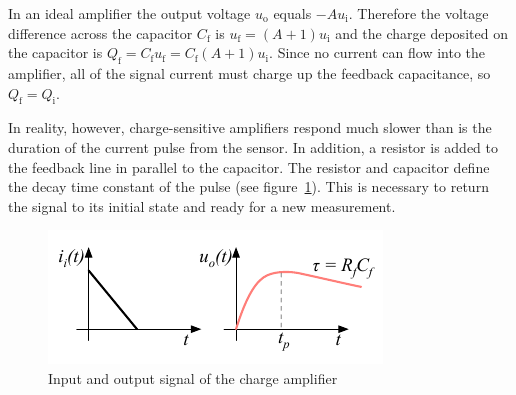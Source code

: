 In an ideal amplifier the output voltage $u_\mathrm{o}$ equals $-Au_\mathrm{i}$. Therefore the voltage difference across the capacitor $C_\mathrm{f}$ is $u_\mathrm{f}=(A+1)u_\mathrm{i}$ and the charge deposited on the capacitor is $Q_\mathrm{f}=C_\mathrm{f}u_\mathrm{f} = C_\mathrm{f}(A+1)u_\mathrm{i}$. Since no current can flow into the amplifier, all of the signal current must charge up the feedback capacitance, so $Q_\mathrm{f} = Q_\mathrm{i}$.

In reality, however, charge-sensitive amplifiers respond much slower than is the duration of the current pulse from the sensor. In addition, a resistor is added to the feedback line in parallel to the capacitor. The resistor and capacitor define the decay time constant of the pulse (see figure~\ref{fig:chgrc}). This is necessary to return the signal to its initial state and ready for a new measurement.
\begin{figure}[!t]
\begin{center}
\includegraphics[width=0.7\linewidth]{02_pulse_formation/pics/plots/chgrc}
\caption{Input and output signal of the charge amplifier}
\label{fig:chgrc}
\end{center}
\end{figure}

